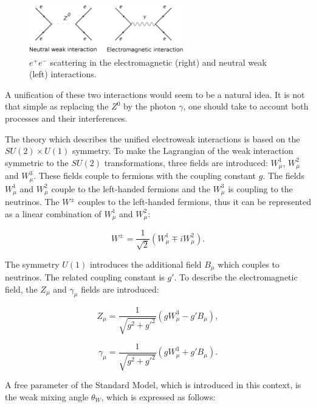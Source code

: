 \begin{figure}[h]
  \centering
  \includegraphics[width=0.6\textwidth]{01_Theory_SM/plots/feynz_uniform.png}
  \caption{$e^{+}e^{-}$ scattering in the electromagnetic (right) and neutral weak (left) interactions.}
  \label{fig:em_weak}
\end{figure}

A unification of these two interactions would seem to be a natural idea. It is not that simple as replacing the $Z^{0}$ by the photon $\gamma$, one
should take to account both processes and their interferences.

The theory \cite{Bilenky:1982ms} which describes the unified electroweak interactions is based on the $SU(2) \times U(1)$ symmetry. To make the Lagrangian of the weak interaction
symmetric to the $SU(2)$ transformations, three fields are introduced: $W_{\mu}^{1}$, $W_{\mu}^{2}$ and $W_{\mu}^{3}$. These fields couple to fermions with
the coupling constant $g$. The fields $W_{\mu}^{1}$ and $W_{\mu}^{2}$ couple to the left-handed fermions and
the $W_{\mu}^{3}$ is coupling to the neutrinos. The $W^{\pm}$ couples to the left-handed fermions, thus it can be represented as a linear combination of
$W_{\mu}^{1}$ and $W_{\mu}^{2}$:

\begin{equation}
 W^{\pm} = \frac{1}{\sqrt{2}}(W_{\mu}^{1} \mp iW_{\mu}^{2}).
\end{equation}

The symmetry $U(1)$ introduces the additional field $B_{\mu}$ which couples to neutrinos. The related coupling constant is $g'$. To describe the electromagnetic
field, the $Z_{\mu}$ and $\gamma_{\mu}$ fields are introduced:

\begin{equation}\label{eq:Zmu}
 Z_{\mu} = \frac{1}{\sqrt{g^{2} + g'^{2}}}(gW^{3}_{\mu} - g'B_{\mu}),
\end{equation}

\begin{equation}\label{eq:Amu}
 \gamma_{\mu} = \frac{1}{\sqrt{g^{2} + g'^{2}}}(gW^{3}_{\mu} + g'B_{\mu}).
\end{equation}

A free parameter of the Standard Model, which is introduced in this context, is the weak mixing angle $\theta_{W}$, which is expressed as follows:

